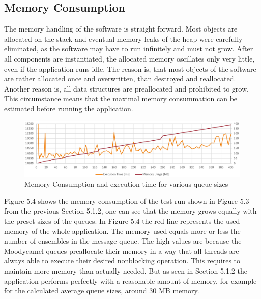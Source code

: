 \subsection{Memory Consumption}
The memory handling of the software is straight forward. Most objects are allocated on the stack and eventual memory leaks of the heap were carefully eliminated, as the software may have to run infinitely and must not grow. After all components are instantiated, the allocated memory oscillates only very little, even if the application runs idle. The reason is, that most objects of the software are rather allocated once and overwritten, than destroyed and reallocated. Another reason is, all data structures are preallocated and prohibited to grow. This circumstance means that the maximal memory consummation can be estimated before running the application.\\
\begin{figure}[h]
\centering
      \includegraphics[width=1\textwidth]{perf_mem_2}
        \caption{Memory Consumption and execution time for various queue sizes}
\end{figure}

Figure 5.4 shows the memory consumption of the test run shown in Figure 5.3 from the previous Section 5.1.2, one can see that the memory grows equally with the preset sizes of the queues. 
In Figure 5.4 the red line represents the used memory of the whole application. The memory used equals more or less the number of ensembles in the  message queue. The high values are because the Moodycamel queues preallocate their memory in a way that all threads are always able to execute their desired nonblocking operation. This requires to maintain more memory than actually needed. But as seen in Section 5.1.2 the application performs perfectly with a reasonable amount of memory, for example for the calculated average queue sizes, around 30 MB memory.

